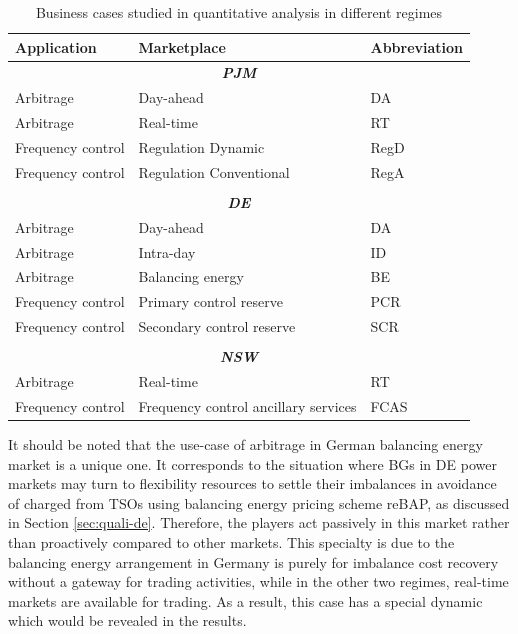 \begin{table}[h!]
	\small
	\centering
	\begin{tabular}{l l l}
		\hline
		\textbf{Application}  & \textbf{Marketplace} & \textbf{Abbreviation}\\
		\hline
		\multicolumn{3}{c}{\textit{\textbf{PJM}}}\\
		Arbitrage & Day-ahead & DA \\
		Arbitrage & Real-time & RT \\
		Frequency control & Regulation Dynamic & RegD \\
		Frequency control & Regulation Conventional & RegA \\
		&&\\
		\multicolumn{3}{c}{\textit{\textbf{DE}}}\\
		Arbitrage & Day-ahead & DA \\
		Arbitrage & Intra-day & ID \\
		Arbitrage & Balancing energy & BE \\
		Frequency control & Primary control reserve & PCR \\
		Frequency control & Secondary control reserve & SCR \\
		&&\\
		\multicolumn{3}{c}{\textit{\textbf{NSW}}}\\
		Arbitrage & Real-time & RT \\
		Frequency control & Frequency control ancillary services & FCAS \\
		\hline
	\end{tabular}
\caption{Business cases studied in quantitative analysis in different regimes}\label{tab:biz-cases}
\end{table}

It should be noted that the use-case of arbitrage in German balancing energy market is a unique one. 
It corresponds to the situation where BGs in DE power markets may turn to flexibility resources to settle their imbalances in avoidance of charged from TSOs using balancing energy pricing scheme reBAP, as discussed in Section \ref{sec:quali-de}. 
Therefore, the players act passively in this market rather than proactively compared to other markets.
This specialty is due to the balancing energy arrangement in Germany is purely for imbalance cost recovery without a gateway for trading activities, while in the other two regimes, real-time markets are available for trading.%
As a result, this case has a special dynamic which would be revealed in the results.

